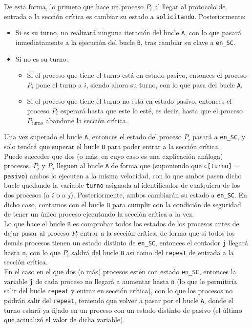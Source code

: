 De esta forma, lo primero que hace un proceso $P_i$ al llegar al protocolo de entrada a la sección crítica es cambiar su estado a \verb|solicitando|. Posteriormente:
\begin{itemize}
    \item Si es su turno, no realizará ninguna iteración del bucle \verb|A|, con lo que pasará inmediatamente a la ejecución del bucle \verb|B|, tras cambiar su clave a \verb|en_SC|.
    \item Si no es su turno:
        \begin{itemize}
            \item Si el proceso que tiene el turno está en estado pasivo, entonces el proceso $P_i$ pone el turno a $i$, siendo ahora su turno, con lo que pasa del bucle \verb|A|.
            \item Si el proceso que tiene el turno no está en estado pasivo, entonces el proceso $P_i$ esperará hasta que este lo esté, es decir, hasta que el proceso $P_{\text{turno}}$ abandone la sección crítica.
        \end{itemize}
\end{itemize}
Una vez superado el bucle \verb|A|, entonces el estado del proceso $P_i$ pasará a \verb|en_SC|, y solo tendrá que superar el bucle \verb|B| para poder entrar a la sección crítica.\\

Puede sueceder que dos (o más, en cuyo caso es una explicación análoga) procesos, $P_i$ y $P_j$ lleguen al bucle \verb|A| de forma que (suponiendo que \verb|c[turno] = pasivo|) ambos lo ejecuten a la misma velocidad, con lo que ambos pasen dicho bucle quedando la variable \verb|turno| asignada al identificador de cualquiera de los dos procesos (a $i$ o a $j$). Posteriormente, ambos cambiarán su estado a \verb|en_SC|. En dicho caso, contamos con el bucle \verb|B| para cumplir con la condición de seguridad de tener un único proceso ejecutando la sección crítica a la vez.\\

Lo que hace el bucle \verb|B| es comprobar todos los estados de los procesos antes de dejar pasar al proceso $P_i$ entrar a la sección crítica, de forma que si todos los demás procesos tienen un estado distinto de \verb|en_SC|, entonces el contador \verb|j| llegará hasta \verb|n|, con lo que $P_i$ saldrá del bucle \verb|B| así como del \verb|repeat| de entrada a la sección crítica.\\

En el caso en el que dos (o más) procesos estén con estado \verb|en_SC|, entonces la variable \verb|j| de cada proceso no llegará a aumentar hasta \verb|n| (lo que le permitiría salir del bucle \verb|repeat| y entrar en sección crítica), con lo que los procesos no podrán salir del \verb|repeat|, teniendo que volver a pasar por el bucle \verb|A|, donde el turno estará ya fijado en un proceso con un estado distinto de pasivo (el último que actualizó el valor de dicha variable).

